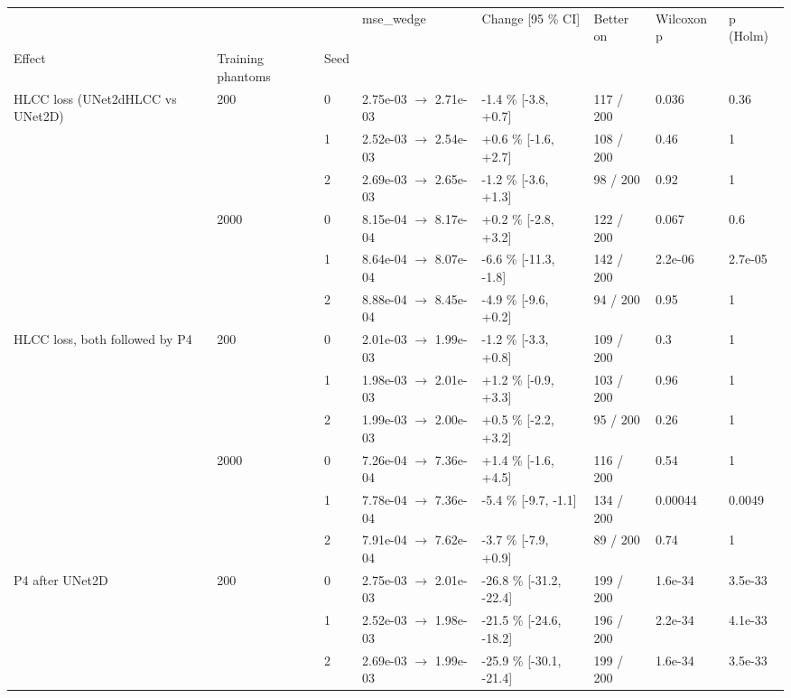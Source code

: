 \begin{tabular}{llllllll}
\toprule
 &  &  & mse\_wedge & Change [95 \% CI] & Better on & Wilcoxon p & p (Holm) \\
Effect & Training phantoms & Seed &  &  &  &  &  \\
\midrule
\multirow[t]{6}{*}{HLCC loss (UNet2dHLCC vs UNet2D)} & \multirow[t]{3}{*}{200} & 0 & 2.75e-03 $\rightarrow$ 2.71e-03 & -1.4 \% [-3.8, +0.7] & 117 / 200 & 0.036 & 0.36 \\
 &  & 1 & 2.52e-03 $\rightarrow$ 2.54e-03 & +0.6 \% [-1.6, +2.7] & 108 / 200 & 0.46 & 1 \\
 &  & 2 & 2.69e-03 $\rightarrow$ 2.65e-03 & -1.2 \% [-3.6, +1.3] & 98 / 200 & 0.92 & 1 \\
\cline{2-8}
 & \multirow[t]{3}{*}{2000} & 0 & 8.15e-04 $\rightarrow$ 8.17e-04 & +0.2 \% [-2.8, +3.2] & 122 / 200 & 0.067 & 0.6 \\
 &  & 1 & 8.64e-04 $\rightarrow$ 8.07e-04 & -6.6 \% [-11.3, -1.8] & 142 / 200 & 2.2e-06 & 2.7e-05 \\
 &  & 2 & 8.88e-04 $\rightarrow$ 8.45e-04 & -4.9 \% [-9.6, +0.2] & 94 / 200 & 0.95 & 1 \\
\cline{1-8} \cline{2-8}
\multirow[t]{6}{*}{HLCC loss, both followed by P4} & \multirow[t]{3}{*}{200} & 0 & 2.01e-03 $\rightarrow$ 1.99e-03 & -1.2 \% [-3.3, +0.8] & 109 / 200 & 0.3 & 1 \\
 &  & 1 & 1.98e-03 $\rightarrow$ 2.01e-03 & +1.2 \% [-0.9, +3.3] & 103 / 200 & 0.96 & 1 \\
 &  & 2 & 1.99e-03 $\rightarrow$ 2.00e-03 & +0.5 \% [-2.2, +3.2] & 95 / 200 & 0.26 & 1 \\
\cline{2-8}
 & \multirow[t]{3}{*}{2000} & 0 & 7.26e-04 $\rightarrow$ 7.36e-04 & +1.4 \% [-1.6, +4.5] & 116 / 200 & 0.54 & 1 \\
 &  & 1 & 7.78e-04 $\rightarrow$ 7.36e-04 & -5.4 \% [-9.7, -1.1] & 134 / 200 & 0.00044 & 0.0049 \\
 &  & 2 & 7.91e-04 $\rightarrow$ 7.62e-04 & -3.7 \% [-7.9, +0.9] & 89 / 200 & 0.74 & 1 \\
\cline{1-8} \cline{2-8}
\multirow[t]{6}{*}{P4 after UNet2D} & \multirow[t]{3}{*}{200} & 0 & 2.75e-03 $\rightarrow$ 2.01e-03 & -26.8 \% [-31.2, -22.4] & 199 / 200 & 1.6e-34 & 3.5e-33 \\
 &  & 1 & 2.52e-03 $\rightarrow$ 1.98e-03 & -21.5 \% [-24.6, -18.2] & 196 / 200 & 2.2e-34 & 4.1e-33 \\
 &  & 2 & 2.69e-03 $\rightarrow$ 1.99e-03 & -25.9 \% [-30.1, -21.4] & 199 / 200 & 1.6e-34 & 3.5e-33 \\

\end{tabular}
